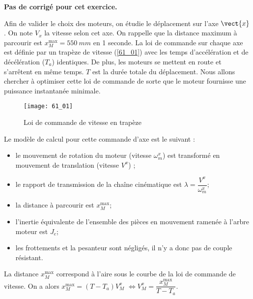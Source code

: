 \normaltrue
\correctionfalse


\setcounter{numques}{0}
\ifcorrection
\else
\textbf{Pas de corrigé pour cet exercice.}
\fi

\ifprof
\else
Afin de valider le choix des moteurs, on étudie le déplacement sur l’axe $\vect{x}$.%
On note $V_x$ la vitesse selon cet axe.
On rappelle que la distance maximum à parcourir est $x_M^{\text{max}} = \SI{550}{mm}$ en 1 seconde.
La loi de commande sur chaque axe est définie par un trapèze de vitesse (\autoref{61_01})
avec les temps d’accélération et de décélération ($T_a$) identiques. De plus, les moteurs se mettent en route et s’arrêtent en
même temps. $T$ est la durée totale du déplacement. Nous allons chercher à optimiser cette loi de commande de sorte
que le moteur fournisse une puissance instantanée minimale.

\begin{figure}[H]
\centering
\texttt{[image: 61\_01]}
\caption{\label{61_01} Loi de commande de vitesse en trapèze}
\end{figure}

Le modèle de calcul pour cette commande d’axe est le suivant :
\begin{itemize}
\item le mouvement de rotation du moteur (vitesse $\omega_m^x$) est transformé en mouvement de translation (vitesse $V^x$) ;
\item le rapport de transmission de la chaîne cinématique est $\lambda = \dfrac{V^x}{\omega_m^x}$;
\item la distance à parcourir est $x_M^{\text{max}}$;
\item l’inertie équivalente de l’ensemble des pièces en mouvement ramenée à l’arbre moteur est $J_e$;
\item les frottements et la pesanteur sont négligés, il n’y a donc pas de couple résistant.
\end{itemize}
\fi
{}
\ifprof
La distance  $x_M^{\text{max}}$ correspond à l'aire sous le courbe de la loi de commande de vitesse.
On a alors 
 $x_M^{\text{max}} = \left(T-T_a\right)V_M^x$ 
 $ \Longleftrightarrow V_M^x=\dfrac{x_M^{\text{max}}}{T-T_a}$. 
\else
\fi

